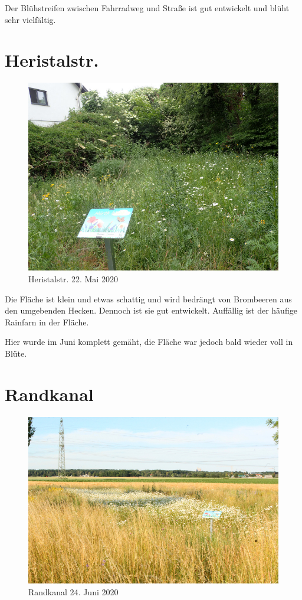 \documentclass[10pt]{article}
\begin{document}
Der Blühstreifen zwischen Fahrradweg und Straße ist gut entwickelt und blüht sehr vielfältig.

\clearpage
\section{Heristalstr.}
\begin{figure}[h!]
  \includegraphics[width=\linewidth]{img/heristal/mai.jpg}
  \caption{Heristalstr. 22. Mai 2020}
\end{figure}

Die Fläche ist klein und etwas schattig und wird bedrängt von Brombeeren aus den umgebenden Hecken.
Dennoch ist sie gut entwickelt. Auffällig ist der häufige Rainfarn in der Fläche.

Hier wurde im Juni komplett gemäht, die Fläche war jedoch bald wieder voll in Blüte.

\clearpage
\section{Randkanal}
\begin{figure}[h!]
  \includegraphics[width=\linewidth]{img/randkanal/juni.jpg}
  \caption{Randkanal 24. Juni 2020}
\end{figure}
\end{document}
